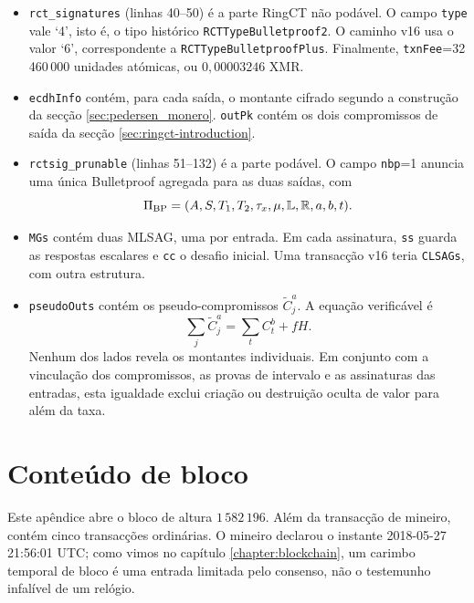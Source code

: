 \begin{appendices}
\begin{itemize}
 \item {\tt rct\_signatures} (linhas 40--50) é a parte RingCT não podável. O
 campo {\tt type} vale `4', isto é, o tipo histórico
 {\tt RCTTypeBulletproof2}. O caminho v16 usa o valor `6', correspondente a
 {\tt RCTTypeBulletproofPlus}. Finalmente, {\tt txnFee}=32\,460\,000 unidades
 atómicas, ou \(0{,}00003246\) XMR.

 \item {\tt ecdhInfo} contém, para cada saída, o montante cifrado segundo a
 construção da secção \ref{sec:pedersen_monero}. {\tt outPk} contém os dois
 compromissos de saída da secção \ref{sec:ringct-introduction}.

 \item {\tt rctsig\_prunable} (linhas 51--132) é a parte podável. O campo
 {\tt nbp}=1 anuncia uma única Bulletproof agregada para as duas saídas, com
 \[
  \Pi_{\rm BP}=(A,S,T_1,T_2,\tau_x,\mu,\mathbb L,\mathbb R,a,b,t).
 \]

 \item {\tt MGs} contém duas MLSAG, uma por entrada. Em cada assinatura,
 {\tt ss} guarda as respostas escalares e {\tt cc} o desafio inicial. Uma
 transacção v16 teria {\tt CLSAGs}, com outra estrutura.

 \item {\tt pseudoOuts} contém os pseudo-compromissos
 \(\widetilde C^a_j\). A equação verificável é
 \[
  \sum_j\widetilde C^a_j=\sum_t C^b_t+fH.
 \]
 Nenhum dos lados revela os montantes individuais. Em conjunto com a
 vinculação dos compromissos, as provas de intervalo e as assinaturas das
 entradas, esta igualdade exclui criação ou destruição oculta de valor para
 além da taxa.
\end{itemize}

\chapter{Conteúdo de bloco}
\label{appendix:block-content}

Este apêndice abre o bloco de altura \(1\,582\,196\). Além da transacção de
mineiro, contém cinco transacções ordinárias. O mineiro declarou o instante
2018-05-27 21:56:01 UTC; como vimos no capítulo \ref{chapter:blockchain}, um
carimbo temporal de bloco é uma entrada limitada pelo consenso, não o
testemunho infalível de um relógio.


\end{appendices}

